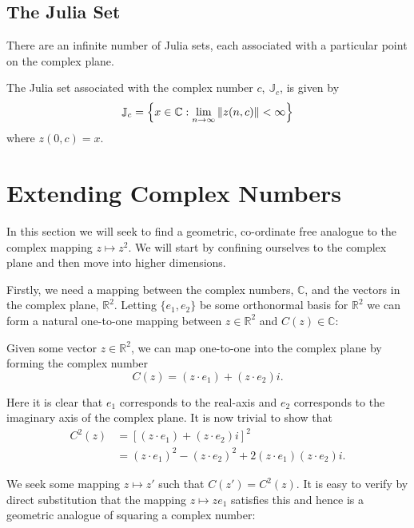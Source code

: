 \subsection{The Julia Set}

There are an infinite number of Julia sets, each associated with
a particular point on the complex plane. 

\begin{definition}
The Julia set associated
with the complex number $c$, $\mathbb{J}_c$, is given by
\[
\mathbb{J}_c = 
\left\{x \in \mathbb{C}
: \lim_{n \rightarrow \infty} \left\Vert z(n,c) \right\Vert < \infty \right\} 
\]
where $z(0,c) = x$.
\end{definition}

\section{Extending Complex Numbers}

In this section we will seek to find a geometric, co-ordinate free
analogue to the complex mapping $z \mapsto z^2$. We will start by 
confining ourselves to the complex plane and then move into higher dimensions.

Firstly, we need a mapping between the complex numbers, $\mathbb{C}$, and
the vectors in the complex plane, $\mathbb{R}^2$. Letting $\{e_1, e_2\}$
be some orthonormal basis for $\mathbb{R}^2$ we can form a natural
one-to-one mapping between $z \in \mathbb{R}^2$ and $C(z) \in \mathbb{C}$:

\begin{definition}
Given some vector $z \in \mathbb{R}^2$, we can map one-to-one into the
complex plane by forming the complex number
\[
C(z) = (z \cdot e_1) + (z \cdot e_2)i.
\]
\end{definition}

Here it is clear that $e_1$ corresponds to the real-axis and $e_2$ 
corresponds to the imaginary axis of the complex plane.
It is now trivial to show that
\begin{align*}
C^2(z) &= [(z \cdot e_1) + (z \cdot e_2)i]^2 \\
       &= (z \cdot e_1)^2 - (z \cdot e_2)^2 + 2(z \cdot e_1)(z \cdot e_2)i.
\end{align*}

We seek some mapping $z \mapsto z'$ such that $C(z') = C^2(z)$. It is 
easy to verify by direct substitution that the mapping 
$z \mapsto ze_1$ satisfies this and hence is a geometric analogue of 
squaring a complex number:

